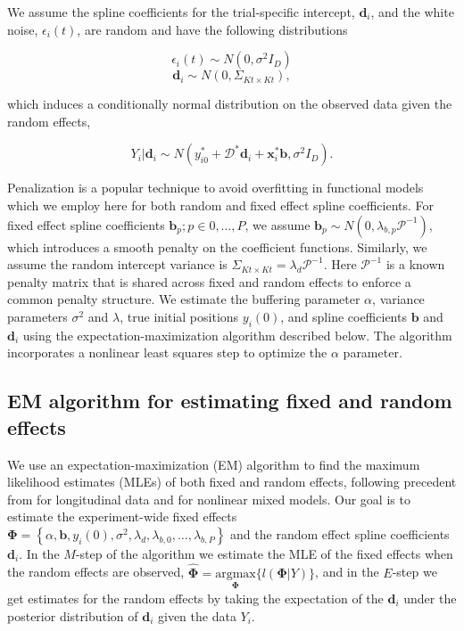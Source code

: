 \documentclass[preprint]{JASA}
\begin{document}
We assume the spline coefficients for the trial-specific intercept,
\(\mathbf{d}_i\), and the white noise, \(\epsilon_i(t)\), are random and
have the following distributions

\[\epsilon_i(t) \sim N(0, \sigma^2I_D)\]
\[\mathbf{d}_i \sim N(0, \Sigma_{Kt\times Kt}),\]

\noindent which induces a conditionally normal distribution on the
observed data given the random effects,

\[Y_i| \mathbf{d}_i \sim N\left(y_{i0}^* + \mathcal{D}^*\mathbf{d}_i+  \mathbf{x}_i^*\mathbf{b}, \sigma^2I_D \right).\]

\noindent Penalization is a popular technique to avoid overfitting in
functional models which we employ here for both random and fixed effect
spline coefficients. For fixed effect spline coefficients
\(\mathbf{b}_p; p\in 0,\ldots,P\), we assume
\(\mathbf{b}_p \sim N(0, \lambda_{b,p}\mathcal{P}^{-1})\), which
introduces a smooth penalty on the coefficient functions. Similarly, we
assume the random intercept variance is
\(\Sigma_{Kt\times Kt} = \lambda_d\mathcal{P}^{-1}\). Here
\(\mathcal{P}^{-1}\) is a known penalty matrix that is shared across
fixed and random effects to enforce a common penalty structure. We
estimate the buffering parameter \(\alpha\), variance parameters
\(\sigma^2\) and \(\lambda\), true initial positions \(y_i(0)\), and
spline coefficients \(\mathbf{b}\) and \(\mathbf{d}_i\) using the
expectation-maximization algorithm described below. The algorithm
incorporates a nonlinear least squares step to optimize the \(\alpha\)
parameter.

\hypertarget{em-algorithm-for-estimating-fixed-and-random-effects}{%
\subsection{EM algorithm for estimating fixed and random
effects}\label{em-algorithm-for-estimating-fixed-and-random-effects}}

\label{sec:em_algorithm}

We use an expectation-maximization (EM) algorithm to find the maximum
likelihood estimates (MLEs) of both fixed and random effects, following
precedent from \cite{laird1982} for longitudinal data and
\cite{walker1996} for nonlinear mixed models. Our goal is to estimate
the experiment-wide fixed effects
\(\mathbf{\Phi} = \left\{\alpha, \mathbf{b}, y_i(0), \sigma^2, \lambda_d, \lambda_{b, 0}, \ldots, \lambda_{b, P}\right\}\)
and the random effect spline coefficients \(\mathbf{d}_i\). In the
\(M\)-step of the algorithm we estimate the MLE of the fixed effects
when the random effects are observed,
\(\widehat{\mathbf{\Phi}} = \underset{\mathbf{\Phi}}{\mathrm{argmax}}\{l(\mathbf{\Phi} | Y)\}\),
and in the \(E\)-step we get estimates for the random effects by taking
the expectation of the \(\mathbf{d}_i\) under the posterior distribution
of \(\mathbf{d}_i\) given the data \(Y_i\).
\end{document}
